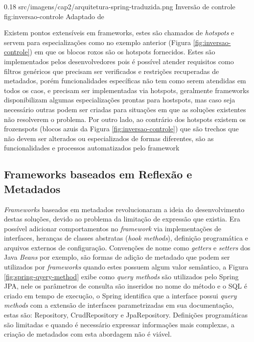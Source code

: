 \begin{image}
{0.18} %
{src/imagens/cap2/arquitetura-spring-traduzida.png} %
{Inversão de controle} %
{fig:inversao-controle} %
{Adaptado de } %
\end{image}

\par Existem pontos extensíveis em frameworks, estes são chamados de \textit{hotspots} e servem para especializações como no exemplo anterior (Figura \ref{fig:inversao-controle}) em que os blocos roxos são os hotspots fornecidos. Estes são implementados pelos desenvolvedores pois é possível atender requisitos como filtros genéricos que precisam ser verificados e restrições recuperadas de metadados, porém funcionalidades específicas não tem como serem atendidas em todos os caos, e precisam ser implementadas via hotspots, geralmente frameworks disponibilizam algumas especializações prontas para hostspots, mas caso seja necessário outras podem ser criadas para situações em que as soluções existentes não resolverem o problema. Por outro lado, ao contrário dos hotspots existem os frozenspots (blocos azuis da Figura \ref{fig:inversao-controle}) que são trechos que não devem ser alterados ou especializados de formas diferentes, são as funcionalidades e processos automatizados pelo framework \cite{markiewicz2001object}

\subsection{Frameworks baseados em Reflexão e Metadados}

\par \textit{Frameworks} baseados em metadados revolucionaram a ideia do desenvolvimento destas soluções, devido ao problema da limitação de expressão que existia. Era possível adicionar comportamentos no \textit{framework} via implementações de interfaces, heranças de classes abstratas (\textit{hook methods}), definição programática e arquivos externos de configuração. Convenções de nome como \textit{getters} e \textit{setters} dos Java \textit{Beans} por exemplo, são formas de adição de metadado que podem ser utilizados por \textit{frameworks} quando estes possuem algum valor semântico, a Figura \ref{fig:spring-qyery-method} exibe como \textit{query methods} são utilizados pelo Spring JPA, nele os parâmetros de consulta são inseridos no nome do método e o SQL é criado em tempo de execução, o Spring identifica que a interface possui \textit{query methods} com a extensão de interfaces parametrizadas em sua documentação, estas são: Repository, CrudRepository e JpaRepository. Definições programáticas são limitadas e quando é necessário expressar informações mais complexas, a criação de metadados com esta abordagem não é viável.

